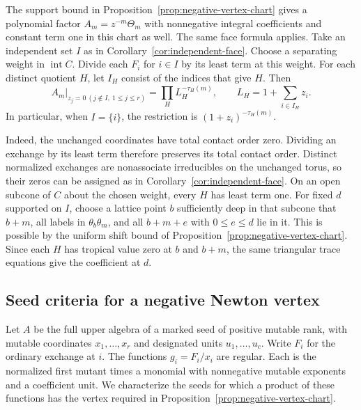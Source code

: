 \documentclass[11pt,reqno]{amsart}
\numberwithin{equation}{section}
\theoremstyle{definition}
\theoremstyle{remark}
\begin{document}
The support bound in Proposition~\ref{prop:negative-vertex-chart} gives
a polynomial factor \(A_m=z^{-m}\Theta_m\) with nonnegative integral
coefficients and constant term one in this chart as well. The same face
formula applies. Take an independent set \(I\) as in
Corollary~\ref{cor:independent-face}. Choose a separating weight in
\(\operatorname{int}C\). Divide each \(F_i\) for \(i\in I\) by its
least term at this weight. For each distinct quotient \(H\), let
\(I_H\) consist of the indices that give \(H\). Then
\[ A_m\big|_{z_j=0\ (j\notin I,\ 1\le j\le r)}=\prod_H L_H^{-\tau_H(m)},\qquad L_H=1+\sum_{i\in I_H}z_i. \]
In particular, when \(I=\{i\}\), the restriction is
\((1+z_i)^{-\tau_H(m)}\).

Indeed, the unchanged coordinates have total contact order zero.
Dividing an exchange by its least term therefore preserves its
total contact order. Distinct normalized exchanges are nonassociate
irreducibles on the unchanged torus, so their zeros can be assigned
as in Corollary~\ref{cor:independent-face}. On an open subcone of
\(C\) about the chosen weight, every \(H\) has least term one.
For fixed \(d\) supported on \(I\), choose a lattice point \(b\)
sufficiently deep in that subcone that \(b+m\), all labels in
\(\theta_b\theta_m\), and all \(b+m+e\) with \(0\le e\le d\) lie
in it. This is possible by the uniform shift bound of
Proposition~\ref{prop:negative-vertex-chart}. Since each \(H\) has
tropical value zero at \(b\) and \(b+m\), the same triangular trace
equations give the coefficient at \(d\).

\subsection{Seed criteria for a negative Newton vertex}

Let \(A\) be the full upper algebra of a marked seed of positive
mutable rank, with mutable coordinates \(x_1,\ldots,x_r\) and designated units \(u_1,\ldots,u_c\).
Write \(F_i\) for the ordinary exchange at \(i\). The functions
\(g_i=F_i/x_i\) are regular. Each is the normalized first mutant
times a monomial with nonnegative mutable exponents and a coefficient
unit. We characterize the seeds for which a product of these functions has
the vertex required in
Proposition~\ref{prop:negative-vertex-chart}.
\end{document}
